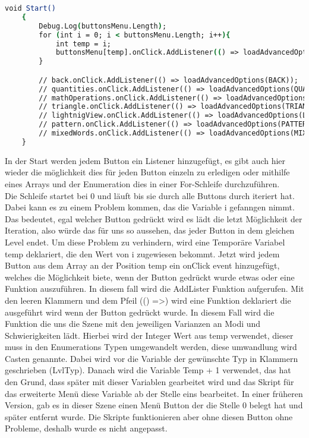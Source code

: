 \begin{lstlisting}[language=csh, caption={MenuPickLevel.cs Klasse Menü start Funktion}]
	void Start()
	{
		Debug.Log(buttonsMenu.Length);
		for (int i = 0; i < buttonsMenu.Length; i++){
			int temp = i;
			buttonsMenu[temp].onClick.AddListener(() => loadAdvancedOptions((LvlType)temp + 1));
		}

		// back.onClick.AddListener(() => loadAdvancedOptions(BACK));
		// quantities.onClick.AddListener(() => loadAdvancedOptions(QUANTITIES));
		// mathOperations.onClick.AddListener(() => loadAdvancedOptions(MATHOPERATIONS));
		// triangle.onClick.AddListener(() => loadAdvancedOptions(TRIANGLE));
		// lightnigView.onClick.AddListener(() => loadAdvancedOptions(LIGHTNIGVIEW));
		// pattern.onClick.AddListener(() => loadAdvancedOptions(PATTER));
		// mixedWords.onClick.AddListener(() => loadAdvancedOptions(MIXEDWORDS));
	}
\end{lstlisting}
In der Start werden jedem Button ein Listener hinzugefügt, es gibt auch hier wieder die möglichkeit dies für jeden Button einzeln zu erledigen oder mithilfe eines Arrays und der Enumeration dies in einer For-Schleife durchzuführen.\\
Die Schleife startet bei 0 und läuft bis sie durch alle Buttons durch iteriert hat. Dabei kann es zu einem Problem kommen, das die Variable i gefanngen nimmt. Das bedeutet, egal welcher Button gedrückt wird es lädt die letzt Möglichkeit der Iteration, also würde das für uns so aussehen, das jeder Button in dem gleichen Level endet. Um diese Problem zu verhindern, wird eine Temporäre Variabel temp deklariert, die den Wert von i zugewiesen bekommt. Jetzt wird jedem Button aus dem Array an der Position temp ein onClick event hinzugefügt, welches die Möglichkeit biete, wenn der Button gedrückt wurde etwas oder eine Funktion auszuführen. In diesem fall wird die AddLister Funktion aufgerufen. Mit den leeren Klammern und dem Pfeil (() =>) wird eine Funktion deklariert die ausgeführt wird wenn der Button gedrückt wurde. In diesem Fall wird die Funktion die uns die Szene mit den jeweiligen Varianzen an Modi und Schwierigkeiten lädt. Hierbei wird der Integer Wert aus temp verwendet, dieser muss in den Enumerations Typen umgewandelt werden, diese umwandlung wird Casten genannte. Dabei wird vor die Variable der gewünschte Typ in Klammern geschrieben (LvlTyp). Danach wird die Variable Temp + 1 verwendet, das hat den Grund, dass später mit dieser Variablen gearbeitet wird und das Skript für das erweiterte Menü diese Variable ab der Stelle eins bearbeitet. In einer früheren Version, gab es in dieser Szene einen Menü Button der die Stelle 0 belegt hat und später entfernt wurde. Die Skripte funktionieren aber ohne diesen Button ohne Probleme, deshalb wurde es nicht angepasst.\\


